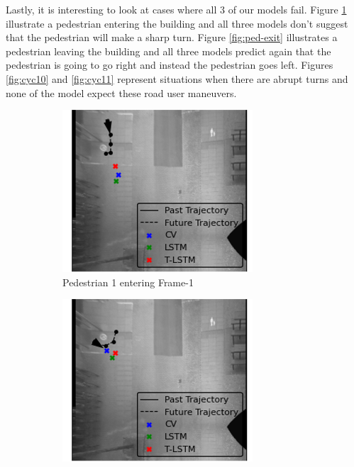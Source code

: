 \documentclass{article}
\begin{document}
Lastly, it is interesting to look at cases where all 3 of our models fail. Figure \ref{fig:ped-entry} illustrate a pedestrian entering the building and all three models don't suggest that the pedestrian will make a sharp turn. Figure \ref{fig:ped-exit} illustrates a pedestrian leaving the building and all three models predict again that the pedestrian is going to go right and instead the pedestrian goes left. Figures \ref{fig:cyc10} and \ref{fig:cyc11} represent situations when there are abrupt turns and none of the model expect these road user maneuvers. 

\begin{figure}[H]
\centering
\begin{subfigure}{0.4\textwidth}
  \centering
  \includegraphics[width=\linewidth]{quali_results/ped-entry.png}
  \caption{Pedestrian 1 entering Frame-1}
  \label{fig:ped-entry}
\end{subfigure}
\begin{subfigure}{0.4\textwidth}
  \centering
  \includegraphics[width=\linewidth]{quali_results/ped-exit.png}

\end{subfigure}
\end{figure}
\end{document}
